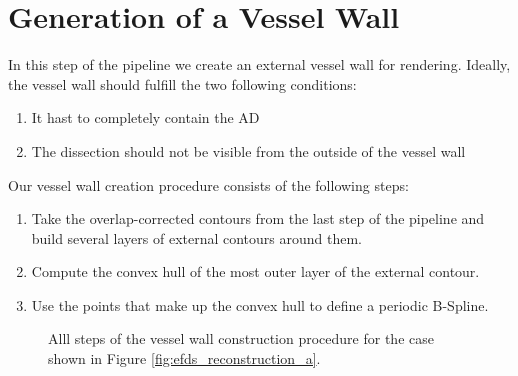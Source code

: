 \documentclass[thesis.tex]{subfiles}
\begin{document}
\section{Generation of a Vessel Wall}
In this step of the pipeline we create an external vessel wall for rendering. Ideally, the vessel wall should fulfill the two following conditions:
\begin{enumerate}
\item{It hast to completely contain the AD}
\item{The dissection should not be visible from the outside of the vessel wall}
\label{vesselwall_conditions}
\end{enumerate}

Our vessel wall creation procedure consists of the following steps:
\begin{enumerate}
\item{Take the overlap-corrected contours from the last step of the pipeline and build several layers of external contours around them.}
\item{Compute the convex hull of the most outer layer of the external contour.}
\item{Use the points that make up the convex hull to define a periodic B-Spline.}
\end{enumerate}

\begin{figure}[t]
\centering
{}
\caption{Alll steps of the vessel wall construction procedure for the case shown in Figure \ref{fig:efds_reconstruction_a}.}
\label{vesselwall_construction}
\end{figure}
\end{document}
